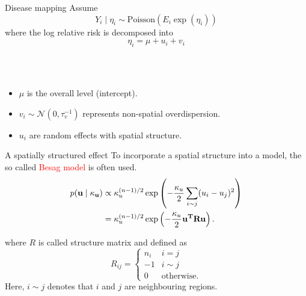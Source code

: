 \documentclass[
  handout]{beamer}
\begin{document}
\begin{frame}{Disease mapping}
\protect\hypertarget{disease-mapping-1}{}
Assume \[
Y_i \mid \eta_i \sim \text{Poisson}(E_i \exp(\eta_i))
\] where the log relative risk is decomposed into \[
\eta_i = \mu + u_i + v_i
\]\\
\strut \\

\begin{itemize}
\item
  \(\mu\) is the overall level (intercept).
\item
  \(v_i \sim \mathcal{N}(0, \tau_v^{-1})\) represents non-spatial
  overdispersion.
\item
  \(u_i\) are random effects with spatial structure.
\end{itemize}
\end{frame}

\begin{frame}{A spatially structured effect}
\protect\hypertarget{a-spatially-structured-effect}{}
To incorporate a spatial structure into a model, the so called
\textcolor{red}{Besag
model} is often used. \[
\begin{aligned}
  p( \bf{u} \mid \kappa_u)& \propto \kappa_u^{(n-1)/2} \exp\left( -
  \frac{\kappa_u}{2} \sum_{i\sim j} (u_i -u_j)^2\right)\\
  & = \kappa_u^{(n-1)/2} \exp\left( -
  \frac{\kappa_u}{2} \bf{u}^T \mathbf{R} \bf{u} \right).
\end{aligned}
\]

where \(R\) is called structure matrix and defined as \[
R_{ij} =  \begin{cases}
            n_i & i=j\\
            -1 & i \sim j\\
            0 & \text{otherwise}.
        \end{cases}
\] Here, \(i \sim j\) denotes that \(i\) and \(j\) are neighbouring
regions.
\end{frame}
\end{document}

